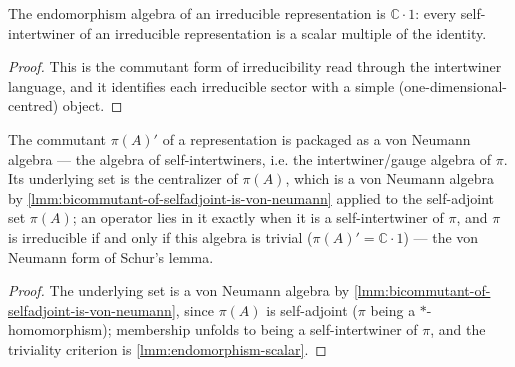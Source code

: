 \begin{lemma}
    \label{lmm:endomorphism-scalar}
    \leanok
    The endomorphism algebra of an irreducible representation is $\mathbb{C}\cdot 1$: every self-intertwiner of an irreducible representation is a scalar multiple of the identity.
\end{lemma}
\begin{proof}
    \leanok
    This is the commutant form of irreducibility read through the intertwiner language, and it identifies each irreducible sector with a simple (one-dimensional-centred) object.
\end{proof}

\begin{theorem}
    \label{thrm:commutant-von-neumann}
    \leanok
    The commutant $\pi(A)'$ of a representation is packaged as a von Neumann algebra --- the algebra of self-intertwiners, i.e. the intertwiner/gauge algebra of $\pi$. Its underlying set is the centralizer of $\pi(A)$, which is a von Neumann algebra by \ref{lmm:bicommutant-of-selfadjoint-is-von-neumann} applied to the self-adjoint set $\pi(A)$; an operator lies in it exactly when it is a self-intertwiner of $\pi$, and $\pi$ is irreducible if and only if this algebra is trivial ($\pi(A)' = \mathbb{C}\cdot 1$) --- the von Neumann form of Schur's lemma.
\end{theorem}
\begin{proof}
    \leanok
    The underlying set is a von Neumann algebra by \ref{lmm:bicommutant-of-selfadjoint-is-von-neumann}, since $\pi(A)$ is self-adjoint ($\pi$ being a $*$-homomorphism); membership unfolds to being a self-intertwiner of $\pi$, and the triviality criterion is \ref{lmm:endomorphism-scalar}.
\end{proof}

